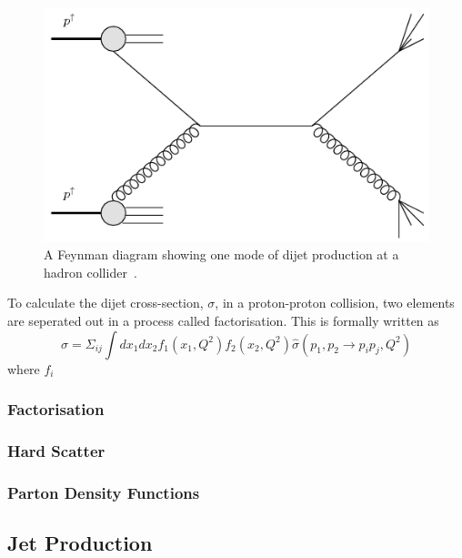 \begin{figure}[!hbt]
  \begin{center}
    \includegraphics[width=0.7\linewidth, angle=0]{figs/Theory/qcd_dijet_feynman.png}
  \end{center}
  \caption[A Feynman diagram showing one mode of dijet production at a hadron collider.]
          {A Feynman diagram showing one mode of dijet production at a hadron collider~\cite{heo-qcd_dijet_feynman}.}
  \label{fig:theo-qcd_dijet_feynman}
\end{figure}

To calculate the dijet cross-section, $\sigma$, in a proton-proton collision,
two elements are seperated out in a process called factorisation.
This is formally written as
\begin{equation}
  \sigma = \Sigma_{ij}\int dx_1 dx_2 f_1(x_1,Q^2)f_2(x_2,Q^2) \hat{\sigma}(p_1, p_2\to p_i p_j,Q^2)
\end{equation}
where $f_i$
\subsubsection{Factorisation}
\subsubsection{Hard Scatter}
\subsubsection{Parton Density Functions}


\subsection{Jet Production}

